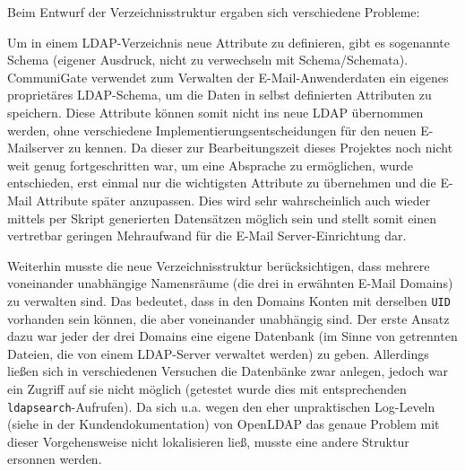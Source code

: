 \documentclass[11pt,a4paper,titlepage=firstiscover,headsepline,bibtotoc]{scrartcl} %
\begin{document}
\medskip Beim Entwurf der Verzeichnisstruktur ergaben sich verschiedene Probleme:

\noindent Um in einem LDAP-Verzeichnis neue Attribute zu definieren, gibt es sogenannte Schema (eigener Ausdruck, nicht zu verwechseln mit Schema/Schemata). CommuniGate verwendet zum Verwalten der E-Mail-Anwenderdaten ein eigenes proprietäres LDAP-Schema, um die Daten in selbst definierten Attributen zu speichern. Diese Attribute können somit nicht ins neue LDAP übernommen werden, ohne verschiedene Implementierungsentscheidungen für den neuen E-Mailserver zu kennen. Da dieser zur Bearbeitungszeit dieses Projektes noch nicht weit genug fortgeschritten war, um eine Absprache zu ermöglichen, wurde entschieden, erst einmal nur die wichtigsten Attribute zu übernehmen und die E-Mail Attribute später anzupassen. Dies wird sehr wahrscheinlich auch wieder mittels per Skript generierten Datensätzen möglich sein und stellt somit einen vertretbar geringen Mehraufwand für die E-Mail Server-Einrichtung dar.

Weiterhin musste die neue Verzeichnisstruktur berücksichtigen, dass mehrere voneinander unabhängige Namensräume (die drei in  erwähnten E-Mail Domains) zu verwalten sind. Das bedeutet, dass in den Domains Konten mit derselben \texttt{UID} vorhanden sein können, die aber voneinander unabhängig sind. Der erste Ansatz dazu war jeder der drei Domains eine eigene Datenbank (im Sinne von getrennten Dateien, die von einem LDAP-Server verwaltet werden) zu geben. Allerdings ließen sich in verschiedenen Versuchen die Datenbänke zwar anlegen, jedoch war ein Zugriff auf sie nicht möglich (getestet wurde dies mit entsprechenden \texttt{ldapsearch}-Aufrufen). Da sich u.a. wegen den eher unpraktischen Log-Leveln (siehe  in der Kundendokumentation) von OpenLDAP das genaue Problem mit dieser Vorgehensweise nicht lokalisieren ließ, musste eine andere Struktur ersonnen werden.
\end{document}
